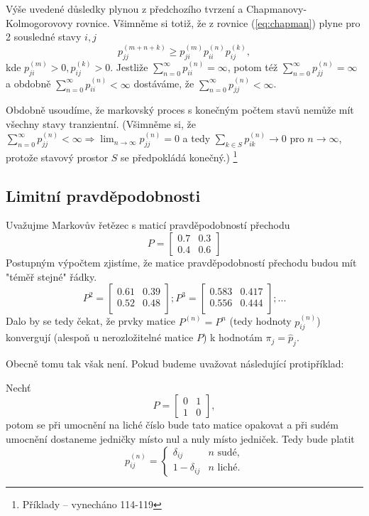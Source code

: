 \documentclass[10pt]{article}
\begin{document}
Výše uvedené důsledky plynou z předchozího tvrzení a Chapmanovy-Kolmogorovovy rovnice. Všimněme si totiž, že z rovnice (\ref{eq:chapman}) plyne pro 2 sousledné stavy $i,j$ $$p_{jj}^{(m+n+k)} \geq p_{ji}^{(m)}p_{ii}^{(n)}p_{ij}^{(k)},$$ kde $p_{ji}^{(m)}>0,p_{ij}^{(k)}>0.$ Jestliže $\sum_{n=0}^{\infty} p_{ii}^{(n)} = \infty$, potom též $\sum_{n=0}^{\infty} p_{jj}^{(n)} = \infty$ a obdobně $\sum_{n=0}^{\infty} p_{ii}^{(n)} < \infty$ dostáváme, že $\sum_{n=0}^{\infty} p_{jj}^{(n)} < \infty$.

Obdobně usoudíme, že markovský proces s konečným počtem stavů nemůže mít všechny stavy tranzientní. (Všimněme si, že $\sum_{n=0}^{\infty} p_{jj}^{(n)} < \infty \Rightarrow \lim_{n \to \infty} p_{jj}^{(n)}=0$ a tedy $\sum_{k \in S} p_{ik}^{(n)} \to 0$ pro $n \to \infty$, protože stavový prostor $S$ se předpokládá konečný.)
\footnote{Příklady -- vynecháno 114-119}

\subsection{Limitní pravděpodobnosti}

Uvažujme Markovův řetězec s maticí pravděpodobností přechodu $$P=
\begin{bmatrix}
0.7&0.3\\
0.4&0.6
\end{bmatrix}$$ Postupným výpočtem zjistíme, že matice pravděpodobností přechodu budou mít "téměř stejné" řádky. 
$$P^2 = \begin{bmatrix}
 0.61 & 0.39 \\
 0.52 & 0.48 \\
\end{bmatrix};
P^3 = \begin{bmatrix}
 0.583 & 0.417 \\
 0.556 & 0.444 \\
\end{bmatrix}; ...$$
Dalo by se tedy čekat, že prvky matice $P^{(n)} = P^n$ (tedy hodnoty $p_{ij}^{(n)}$) konvergují (alespoň u nerozložitelné matice $P$) k hodnotám $\pi_j = \hat{p}_j.$

Obecně tomu tak však není. Pokud budeme uvažovat následující protipříklad:

Nechť $$P=
\begin{bmatrix}
0&1\\
1&0
\end{bmatrix},$$ potom se při umocnění na liché číslo bude tato matice opakovat a při sudém umocnění dostaneme jedničky místo nul a nuly místo jedniček. Tedy bude platit \begin{equation}
p_{ij}^{(n)} = \begin{cases}
\delta_{ij} & n \text{ sudé,}\\
1-\delta_{ij} & n \text{ liché.}
\end{cases}
\end{equation}
\end{document}
